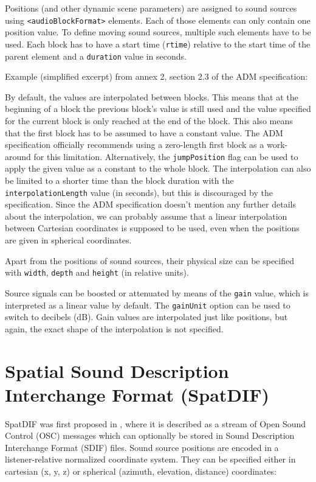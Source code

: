 Positions (and other dynamic scene parameters)
are assigned to sound sources using \texttt{<audioBlockFormat>} elements.
Each of those elements can only contain one position value.
To define moving sound sources, multiple such elements have to be used.
Each block has to have a start time (\texttt{rtime})
relative to the start time of the parent element
and a \texttt{duration} value in seconds.

Example (simplified excerpt) from annex 2,
section 2.3 of the ADM specification:


\noindent
By default,
the values are interpolated between blocks.
This means that at the beginning of a block
the previous block's value is still used
and the value specified for the current block
is only reached at the end of the block.
This also means that the first block
has to be assumed to have a constant value.
The ADM specification officially recommends
using a zero-length first block as a work-around for this limitation.
Alternatively, the \texttt{jumpPosition} flag
can be used to apply the given value as a constant to the whole block.
The interpolation can also be limited to a shorter time than the block duration
with the \texttt{interpolationLength} value (in seconds),
but this is discouraged by the specification.
Since the ADM specification doesn't mention any further details
about the interpolation,
we can probably assume that a linear interpolation between Cartesian coordinates
is supposed to be used,
even when the positions are given in spherical coordinates.

Apart from the positions of sound sources,
their physical size can be specified with
\texttt{width},
\texttt{depth} and
\texttt{height} (in relative units).

Source signals can be boosted or attenuated by means of the
\texttt{gain} value, which is interpreted as a linear value by default.
The \texttt{gainUnit} option can be used to switch to decibels (dB).
Gain values are interpolated just like positions,
but again, the exact shape of the interpolation is not specified.


\section{Spatial Sound Description Interchange Format (SpatDIF)}
\label{sec:SpatDIF}

SpatDIF was first proposed in
\parencite{peters2007spatdif},
where it is described as a stream of
Open Sound Control (OSC)
messages which can optionally be stored in
Sound Description Interchange Format (SDIF)
files.
Sound source positions are encoded in a
listener-relative normalized coordinate system.
They can be specified either in cartesian (x, y, z)
or spherical (azimuth, elevation, distance) coordinates:


